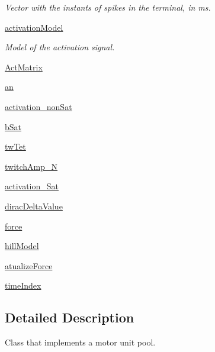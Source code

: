 \begin{DoxyCompactItemize}
\begin{DoxyCompactList}\small\item\em Vector with the instants of spikes in the terminal, in ms. \end{DoxyCompactList}\item 
\hyperlink{class_motor_unit_pool_1_1_motor_unit_pool_abaa7680d0691fac81f66b200dfcfd203}{activation\-Model}
\begin{DoxyCompactList}\small\item\em Model of the activation signal. \end{DoxyCompactList}\item 
\hyperlink{class_motor_unit_pool_1_1_motor_unit_pool_ad03b9e215e833188060e90bc4392d42b}{Act\-Matrix}
\item 
\hyperlink{class_motor_unit_pool_1_1_motor_unit_pool_ac72c67b4a1f6134965ab77e2d798b5a4}{an}
\item 
\hyperlink{class_motor_unit_pool_1_1_motor_unit_pool_a467ac7b080b79b9515d5846d75e95d1c}{activation\-\_\-non\-Sat}
\item 
\hyperlink{class_motor_unit_pool_1_1_motor_unit_pool_a4e107835e34b4f56d06b9b28c143fe40}{b\-Sat}
\item 
\hyperlink{class_motor_unit_pool_1_1_motor_unit_pool_a785a769c5b4824603a24339e4f0d8dfe}{tw\-Tet}
\item 
\hyperlink{class_motor_unit_pool_1_1_motor_unit_pool_a03538b06e7220f9d48c7306ed6508c05}{twitch\-Amp\-\_\-\-N}
\item 
\hyperlink{class_motor_unit_pool_1_1_motor_unit_pool_ac475d1369c38d0bc5064c7243b4e1d44}{activation\-\_\-\-Sat}
\item 
\hyperlink{class_motor_unit_pool_1_1_motor_unit_pool_a48b53d4f838ca8cfe2bc41c8308f2060}{dirac\-Delta\-Value}
\item 
\hyperlink{class_motor_unit_pool_1_1_motor_unit_pool_a97011c17140c45a42a00105279f014ad}{force}
\item 
\hyperlink{class_motor_unit_pool_1_1_motor_unit_pool_a963061fdcfee8f9dc33e4d6f130ea59b}{hill\-Model}
\item 
\hyperlink{class_motor_unit_pool_1_1_motor_unit_pool_a21f9a6a5d113b5b0f67a3557c47ebd5a}{atualize\-Force}
\item 
\hyperlink{class_motor_unit_pool_1_1_motor_unit_pool_ab5659e1c9355ecf529d9b8be8cbf6d65}{time\-Index}
\end{DoxyCompactItemize}


\subsection{Detailed Description}
Class that implements a motor unit pool. 

